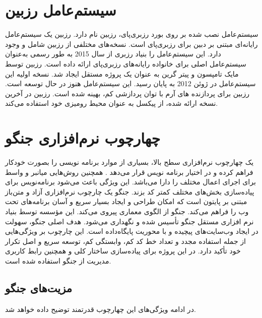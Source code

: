 {\section{سیستم‌عامل رزبین}
سیستم‌عامل نصب شده بر روی بورد رزبری‌پای، رزبین نام دارد. رزبین یک سیستم‌عامل رایانه‌ای مبتنی بر دبین برای رزبری‌پای است. نسخه‌های مختلفی از رزبین شامل  و  وجود دارد.
این سیستم‌عامل را بنیاد رزبری از سال 2015 به طور رسمی به‌عنوان سیستم‌عامل اصلی برای خانواده رایانه‌های رزبری‌پای ارائه داده است. رزبین توسط مایک تامپسون و پیتر گرین به عنوان یک پروژه مستقل ایجاد شد. نسخه اولیه این سیستم‌عامل در ژوئن 2012 به پایان رسید. این سیستم‌عامل هنوز در حال توسعه است. رزبین برای پردازنده های آرم با توان پردازشی کم، بهینه شده است. رزبین در آخرین نسخه ارائه شده، از پیکسل به عنوان محیط رومیزی خود استفاده می‌کند.

\section{چهارچوب نرم‌افزاری جنگو}
یک چهارچوب نرم‌افزاری سطح بالا، بسیاری از موارد برنامه نویسی را بصورت خودکار فراهم کرده و در اختیار برنامه نویس قرار می‌دهد . همچنین روش‌هایی میانبر و واسط برای اجرای اعمال مختلف را دارا می‌باشد. این ویژگی باعث می‌شود برنامه‌نویس برای پیاده‌سازی بخش‌های مختلف کمتر کد بزند.
جنگو\cite{Django}  یک چارچوب نرم‌افزاری آزاد و متن‌باز مبتنی بر پایتون است که امکان طراحی و ایجاد بسیار سریع و آسان برنامه‌های تحت وب را فراهم می‌کند. جنگو از الگوی معماری  پیروی می‌کند. این مؤسسه توسط بنیاد نرم افزاری مستقل جنگو تأسیس شده و نگهداری می‌شود.
هدف اصلی جنگو، سهولت در ایجاد وب‌سایت‌های پیچیده و با محوریت پایگاه‌داده است. این چارچوب بر ویژگی‌هایی از جمله استفاده مجدد و تعداد خط کد کم، وابستگی کم، توسعه سریع و اصل تکرار خود تأکید دارد.
در این پروژه برای پیاده‌سازی ساختار کلی  و همچنین رابط کاربری مدیریت از جنگو استفاده شده است.

\subsection{مزیت‌های جنگو}
در ادامه ویژگی‌های این چهارچوب قدرتمند توضیح داده خواهد شد.
}
